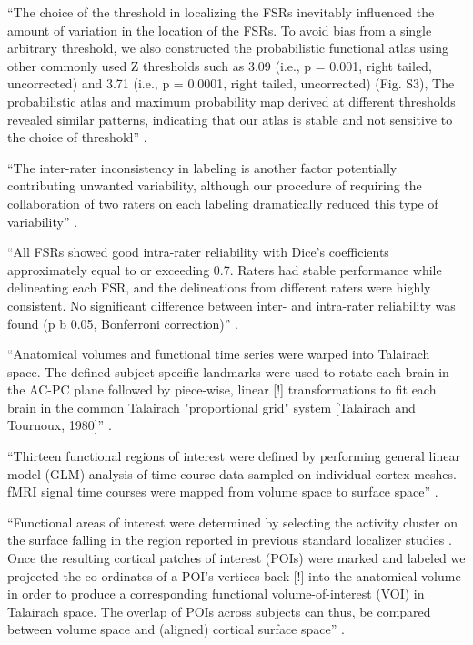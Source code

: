 ``The choice of the threshold in localizing the FSRs inevitably influenced the
amount of variation in the location of the FSRs.
%
To avoid bias from a single arbitrary threshold, we also constructed the
probabilistic functional atlas using other commonly used Z thresholds such as
3.09 (i.e., p = 0.001, right tailed, uncorrected) and 3.71 (i.e., p = 0.0001,
right tailed, uncorrected) (Fig. S3),
%
The probabilistic atlas and maximum probability map derived at different
thresholds revealed similar patterns, indicating that our atlas is stable and
not sensitive to the choice of threshold'' \citep{zhen2015quantifying}.

``The inter-rater inconsistency in labeling is another factor potentially
contributing unwanted variability, although our procedure of requiring the
collaboration of two raters on each labeling dramatically reduced this type of
variability'' \citep{zhen2015quantifying}.

``All FSRs showed good intra-rater reliability with Dice's coefficients
approximately equal to or exceeding 0.7.
%
Raters had stable performance while delineating each FSR, and the delineations
from different raters were highly consistent.
%
No significant difference between inter- and intra-rater reliability was found
(p b 0.05, Bonferroni correction)''
\citep{zhen2015quantifying}.



``Anatomical volumes and functional time series were warped into Talairach
space.
%
The defined subject-specific landmarks were used to rotate each brain in the
AC-PC plane followed by piece-wise, linear [!] transformations to fit each brain
in the common Talairach "proportional grid" system [Talairach and Tournoux,
1980]'' \citep{frost2012measuring}.

``Thirteen functional regions of interest were defined by performing general
linear model (GLM) analysis of time course data sampled on individual cortex
meshes.
%
fMRI signal time courses were mapped from volume space to surface
space'' \citep{frost2012measuring}.

``Functional areas of interest were determined by selecting the activity cluster
on the surface falling in the region reported in previous standard localizer
studies \citep{frost2012measuring}.
%
Once the resulting cortical patches of interest (POIs) were marked and labeled
we projected the co-ordinates of a POI's vertices back [!] into the anatomical
volume in order to produce a corresponding functional volume-of-interest (VOI)
in Talairach space.
%
The overlap of POIs across subjects can thus, be compared between volume space
and (aligned) cortical surface space'' \citep{frost2012measuring}.

